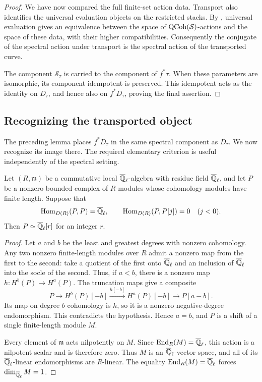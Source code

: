 \begin{proof}
We have now compared the full finite-set action data.  Transport also
identifies the universal evaluation objects on the restricted stacks.
By \cite[Theorem~8.1.4]{AGKRRV}, universal evaluation gives an
equivalence between the space of $\operatorname{QCoh}(\mathcal S)$-actions and the
space of these data, with their higher compatibilities.  Consequently
the conjugate of the spectral action under transport is the spectral
action of the transported curve.

The component $\mathcal S_\tau$ is carried to the component of
$f^*\tau$.  When these parameters are isomorphic, its component
idempotent is preserved.  This idempotent acts as the identity on
$D_\tau$, and hence also on $f^*D_\tau$, proving the final assertion.
\end{proof}

\subsection{Recognizing the transported object}

The preceding lemma places $f^*D_\tau$ in the same spectral component as
$D_\tau$.  We now recognize its image there.  The required elementary
criterion is useful independently of the spectral setting.

\begin{lemma}\label{lem:point-object}
Let $(R,\mathfrak m)$ be a commutative local $\overline{\mathbb Q}_{\ell}$-algebra with residue
field $\overline{\mathbb Q}_{\ell}$, and let $P$ be a nonzero bounded complex of $R$-modules whose
cohomology modules have finite length.  Suppose that
\[
 \operatorname{Hom}_{D(R)}(P,P)=\overline{\mathbb Q}_{\ell},\qquad
 \operatorname{Hom}_{D(R)}(P,P[j])=0\quad(j<0).
\]
Then $P\simeq\overline{\mathbb Q}_{\ell}[r]$ for an integer $r$.
\end{lemma}

\begin{proof}
Let $a$ and $b$ be the least and greatest degrees with nonzero
cohomology.  Any two nonzero finite-length modules over $R$ admit a
nonzero map from the first to the second: take a quotient of the first
onto $\overline{\mathbb Q}_{\ell}$ and an inclusion of $\overline{\mathbb Q}_{\ell}$ into the socle of the second.  Thus,
if $a<b$, there is a nonzero map
$h:H^b(P)\to H^a(P)$.  The truncation maps give a composite
\[
 P\longrightarrow H^b(P)[-b]
   \xrightarrow{h[-b]}H^a(P)[-b]
   \longrightarrow P[a-b].
\]
Its map on degree $b$ cohomology is $h$, so it is a nonzero negative-degree
endomorphism.  This contradicts the hypothesis.  Hence $a=b$, and $P$ is
a shift of a single finite-length module $M$.

Every element of $\mathfrak m$ acts nilpotently on $M$.  Since
$\operatorname{End}_R(M)=\overline{\mathbb Q}_{\ell}$, this action is a nilpotent scalar and is therefore zero.
Thus $M$ is an $\overline{\mathbb Q}_{\ell}$-vector space, and all of its $\overline{\mathbb Q}_{\ell}$-linear
endomorphisms are $R$-linear.  The equality $\operatorname{End}_R(M)=\overline{\mathbb Q}_{\ell}$ forces
$\dim_{\overline{\mathbb Q}_{\ell}} M=1$.
\end{proof}

